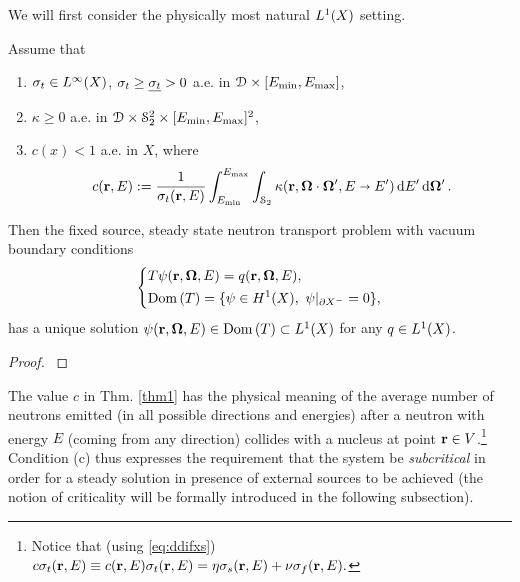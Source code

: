 We will first consider the physically most natural $\Lp[1](X)$ setting.
\begin{theorem}\label{thm1}
Assume that
\begin{enumerate}[label=(\alph*)]
	\item $\sigma_t \in \Lp[\infty](X)$, $\sigma_t \geq \mst > 0$ a.e. in $\VV\times[\Emin,\Emax]$,
	\item $\kappa \geq 0$ a.e. in $\VV\times\Sphere^2\times[\Emin,\Emax]^2$,
	\item $\displaystyle c(x) < 1$ a.e. in $X$, where
	  \begin{equation}\label{eq:c}
	    c(\br,E) := \frac{1}{\sigma_t(\br,E)}\int_{\Emin}^{\Emax}\int_{\Sphere} \kappa(\br,\bomega\cdot\bomega',
	    E\shortrightarrow E')\,\d{E'}\d{\bomega'}.
	  \end{equation}
\end{enumerate}
Then the fixed source, steady state neutron transport problem with vacuum boundary conditions 
\begin{equation*}
  \left\{
  \begin{aligned}
     &T\psi(\br,\bomega,E) = q(\br,\bomega,E),\\
     &\Dom{T} = \{\psi\in \Hp[1](X),\ \psi\vert_{\pX[-]} = 0\},
  \end{aligned}
  \right.
\end{equation*}
has a unique solution $\psi(\br,\bomega,E)\in\Dom{T}\subset\Lp[1](X)$ for any $q\in \Lp[1](X)$.
\end{theorem}
\begin{proof}
\cite[Chap. XXI, \S 2, Proposition 5]{DautrayLions}
\end{proof}

The value $c$ in Thm. \ref{thm1} has the physical meaning of the average number of neutrons emitted (in all possible
directions and energies) after a neutron with energy $E$ (coming from any direction) collides with a nucleus at point
$\br\in V$.\footnote{\label{ftn:c}Notice that (using \eqref{eq:ddifxs})
$
	c\sigma_t(\br,E)\equiv c(\br,E)\sigma_t(\br,E) = \eta\sigma_s(\br,E) + \nu\sigma_f(\br,E).
$}
Condition (c) thus expresses the requirement that the system be \textit{subcritical} in order for a
steady solution in presence of external sources to be achieved (the notion of criticality will be formally introduced in the following
subsection).

